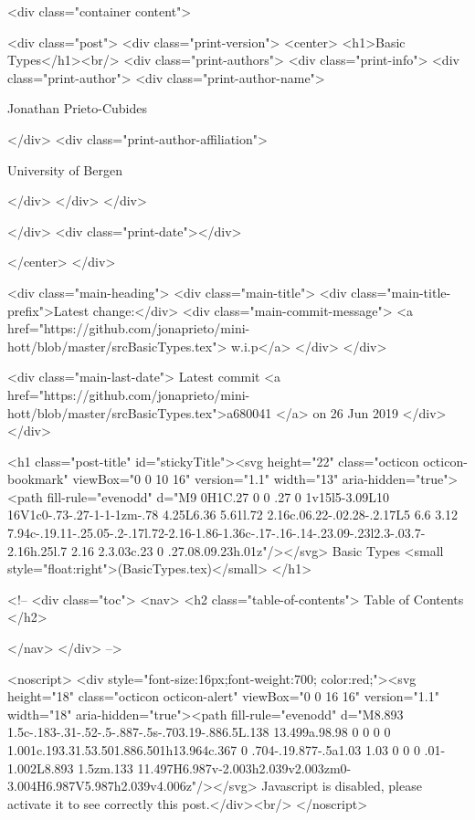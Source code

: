       <div class="container content">
        







<div class="post">
  <div class="print-version">
    <center>
      <h1>Basic Types</h1><br/>
        <div class="print-authors">
          <div class="print-info">
            <div class="print-author">
              <div class="print-author-name">
                
                  Jonathan Prieto-Cubides
                
              </div>
              <div class="print-author-affiliation">
                
                  University of Bergen
                
                </div>
            </div>
          </div>
          
          
        </div>
        <div class="print-date"></div>
        
        
    </center>
  </div>

  
  <div class="main-heading">
    <div class="main-title">
      <div class="main-title-prefix">Latest change:</div>
      <div class="main-commit-message">
            <a href="https://github.com/jonaprieto/mini-hott/blob/master/srcBasicTypes.tex">
              w.i.p</a>
      </div>
    </div>

    <div class="main-last-date">
      Latest commit <a href="https://github.com/jonaprieto/mini-hott/blob/master/srcBasicTypes.tex">a680041 </a> on  26 Jun 2019
    </div>
  </div>
  

  <h1 class="post-title" id="stickyTitle"><svg height="22" class="octicon octicon-bookmark" viewBox="0 0 10 16" version="1.1" width="13" aria-hidden="true"><path fill-rule="evenodd" d="M9 0H1C.27 0 0 .27 0 1v15l5-3.09L10 16V1c0-.73-.27-1-1-1zm-.78 4.25L6.36 5.61l.72 2.16c.06.22-.02.28-.2.17L5 6.6 3.12 7.94c-.19.11-.25.05-.2-.17l.72-2.16-1.86-1.36c-.17-.16-.14-.23.09-.23l2.3-.03.7-2.16h.25l.7 2.16 2.3.03c.23 0 .27.08.09.23h.01z"/></svg> Basic Types <small style="float:right">(BasicTypes.tex)</small>
  </h1>

  <!-- 
  <div class="toc">
    <nav>
    <h2 class="table-of-contents"> Table of Contents </h2>
      

    </nav>
  </div>
   -->

  <noscript>
  <div style="font-size:16px;font-weight:700; color:red;"><svg height="18" class="octicon octicon-alert" viewBox="0 0 16 16" version="1.1" width="18" aria-hidden="true"><path fill-rule="evenodd" d="M8.893 1.5c-.183-.31-.52-.5-.887-.5s-.703.19-.886.5L.138 13.499a.98.98 0 0 0 0 1.001c.193.31.53.501.886.501h13.964c.367 0 .704-.19.877-.5a1.03 1.03 0 0 0 .01-1.002L8.893 1.5zm.133 11.497H6.987v-2.003h2.039v2.003zm0-3.004H6.987V5.987h2.039v4.006z"/></svg> Javascript is disabled, please activate it to see correctly this post.</div><br/>
  </noscript>

